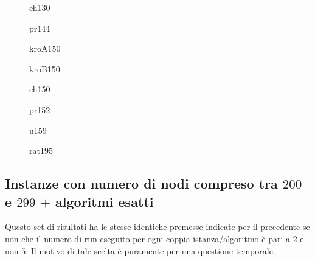 \documentclass[11pt]{article}
\begin{document}
\begin{figure}[htbp]
\centering
{}
\label{fig:ch130}
\caption{ch130}
\end{figure}

\begin{figure}[htbp]
\centering
{}
\label{fig:pr144}
\caption{pr144}
\end{figure}

\begin{figure}[htbp]
\centering
{}
\label{fig:kroA150}
\caption{kroA150}
\end{figure}

\begin{figure}[htbp]
\centering
{}
\label{fig:kroB150}
\caption{kroB150}
\end{figure}

\begin{figure}[htbp]
\centering
{}
\label{fig:ch150}
\caption{ch150}
\end{figure}

\begin{figure}[htbp]
\centering
{}
\label{fig:pr152}
\caption{pr152}
\end{figure}

\begin{figure}[htbp]
\centering
{}
\label{fig:u159}
\caption{u159}
\end{figure}

\begin{figure}[htbp]
\centering
{}
\label{fig:rat195}
\caption{rat195}
\end{figure}

\FloatBarrier

\subsection*{Instanze con numero di nodi compreso tra \textbf{$200$} e \textbf{$299$} $+$ algoritmi esatti}

Questo set di risultati ha le stesse identiche premesse indicate per il precedente se non che il numero di run eseguito per ogni coppia istanza/algoritmo è pari a $2$ e non $5$. Il motivo di tale scelta è puramente per una questione temporale.
\end{document}
